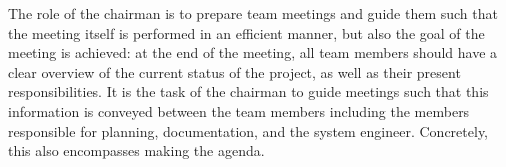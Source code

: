 The role of the chairman is to prepare team meetings and guide them such that the meeting itself is performed in an efficient manner, but also the goal of the meeting is achieved: at the end of the meeting, all team members should have a clear overview of the current status of the project, as well as their present responsibilities. It is the task of the chairman to guide meetings such that this information is conveyed between the team members including the members responsible for planning, documentation, and the system engineer. Concretely, this also encompasses making the agenda.
